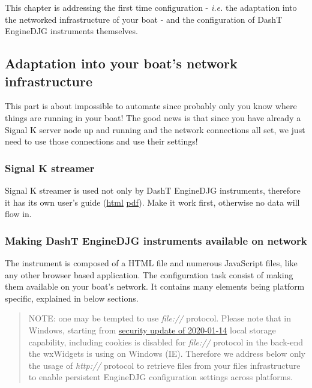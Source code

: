 \documentclass[11pt]{article}
\begin{document}
    This chapter is addressing the first time configuration - \emph{i.e.}
the adaptation into the networked infrastructure of your boat - and the
configuration of DashT EngineDJG instruments themselves.

    \hypertarget{adaptation-into-your-boats-network-infrastructure}{%
\subsection{Adaptation into your boat's network
infrastructure}\label{adaptation-into-your-boats-network-infrastructure}}

    This part is about impossible to automate since probably only you know
where things are running in your boat! The good news is that since you
have already a Signal K server node up and running and the network
connections all set, we just need to use those connections and use their
settings!

    \hypertarget{signal-k-streamer}{%
\subsubsection{Signal K streamer}\label{signal-k-streamer}}

    Signal K streamer is used not only by DashT EngineDJG instruments,
therefore it has its own user's guide
(\href{../signalk/SignalKInputStreamerUsage.html}{html} \textbar{}
\href{../signalk/SignalKInputStreamerUsage.pdf}{pdf}). Make it work
first, otherwise no data will flow in.

    \hypertarget{making-dasht-enginedjg-instruments-available-on-network}{%
\subsubsection{Making DashT EngineDJG instruments available on
network}\label{making-dasht-enginedjg-instruments-available-on-network}}

    The instrument is composed of a HTML file and numerous JavaScript files,
like any other browser based application. The configuration task consist
of making them available on your boat's network. It contains many
elements being platform specific, explained in below sections.

    \begin{quote}
NOTE: one may be tempted to use \emph{file://} protocol. Please note
that in Windows, starting from
\href{https://support.microsoft.com/en-us/help/4534251/cumulative-security-update-for-internet-explorer}{security
update of 2020-01-14} local storage capability, including cookies is
disabled for \emph{file://} protocol in the back-end the wxWidgets is
using on Windows (IE). Therefore we address below only the usage of
\emph{http://} protocol to retrieve files from your files infrastructure
to enable persistent EngineDJG configuration settings across platforms.
\end{quote}
\end{document}
